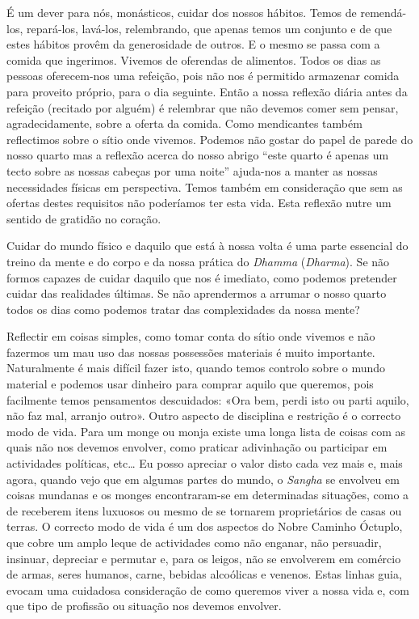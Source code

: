 É um dever para nós, monásticos, cuidar dos nossos hábitos. Temos de
remendá-los, repará-los, lavá-los, relembrando, que apenas temos um
conjunto e de que estes hábitos provêm da generosidade de outros. E o
mesmo se passa com a comida que ingerimos. Vivemos de oferendas de
alimentos. Todos os dias as pessoas oferecem-nos uma refeição, pois não
nos é permitido armazenar comida para proveito próprio, para o dia
seguinte. Então a nossa reflexão diária antes da refeição (recitado por
alguém) é relembrar que não devemos comer sem pensar, agradecidamente,
sobre a oferta da comida. Como mendicantes também reflectimos sobre o
sítio onde vivemos. Podemos não gostar do papel de parede do nosso
quarto mas a reflexão acerca do nosso abrigo ``este quarto é apenas um
tecto sobre as nossas cabeças por uma noite'' ajuda-nos a manter as
nossas necessidades físicas em perspectiva. Temos também em consideração
que sem as ofertas destes requisitos não poderíamos ter esta vida. Esta
reflexão nutre um sentido de gratidão no coração.

Cuidar do mundo físico e daquilo que está à nossa volta é uma parte
essencial do treino da mente e do corpo e da nossa prática do
\emph{Dhamma} (\emph{Dharma}). Se não formos capazes de cuidar daquilo
que nos é imediato, como podemos pretender cuidar das realidades
últimas. Se não aprendermos a arrumar o nosso quarto todos os dias como
podemos tratar das complexidades da nossa mente?

Reflectir em coisas simples, como tomar conta do sítio onde vivemos e
não fazermos um mau uso das nossas possessões materiais é muito
importante. Naturalmente é mais difícil fazer isto, quando temos
controlo sobre o mundo material e podemos usar dinheiro para comprar
aquilo que queremos, pois facilmente temos pensamentos descuidados: «Ora
bem, perdi isto ou parti aquilo, não faz mal, arranjo outro». Outro
aspecto de disciplina e restrição é o correcto modo de vida. Para um
monge ou monja existe uma longa lista de coisas com as quais não nos
devemos envolver, como praticar adivinhação ou participar em actividades
políticas, etc\ldots{} Eu posso apreciar o valor disto cada vez mais e, mais
agora, quando vejo que em algumas partes do mundo, o \emph{Sangha} se
envolveu em coisas mundanas e os monges encontraram-se em determinadas
situações, como a de receberem itens luxuosos ou mesmo de se tornarem
proprietários de casas ou terras. O correcto modo de vida é um dos
aspectos do Nobre Caminho Óctuplo, que cobre um amplo leque de
actividades como não enganar, não persuadir, insinuar, depreciar e
permutar e, para os leigos, não se envolverem em comércio de armas,
seres humanos, carne, bebidas alcoólicas e venenos. Estas linhas guia,
evocam uma cuidadosa consideração de como queremos viver a nossa vida e,
com que tipo de profissão ou situação nos devemos envolver.

